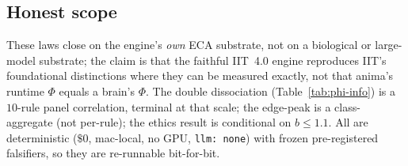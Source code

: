 \subsection{Honest scope}
\label{app:phi-scope}

These laws close on the engine's \emph{own} ECA substrate, not on a biological
or large-model substrate; the claim is that the faithful IIT~4.0 engine
reproduces IIT's foundational distinctions where they can be measured exactly,
not that anima's runtime $\Phi$ equals a brain's $\Phi$. The double dissociation
(Table~\ref{tab:phi-info}) is a $10$-rule panel correlation, terminal at that
scale; the edge-peak is a class-aggregate (not per-rule); the ethics result is
conditional on $b\le1.1$. All are deterministic ($\$0$, mac-local, no GPU,
\texttt{llm: none}) with frozen pre-registered falsifiers, so they are
re-runnable bit-for-bit.
